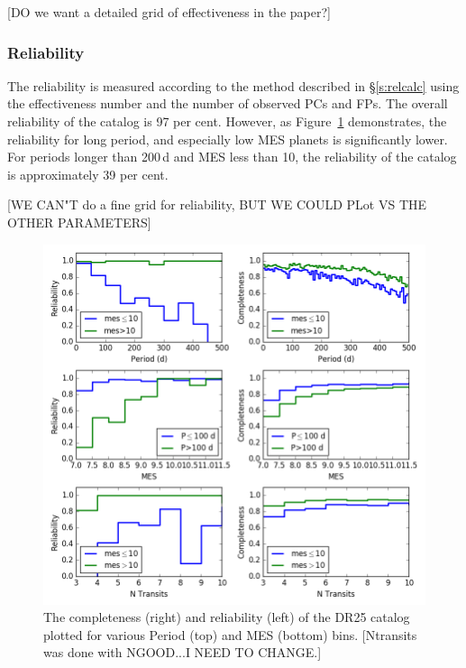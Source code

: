 [DO we want a detailed grid of effectiveness in the paper?]

\subsubsection{Reliability}
\label{s:reliability}
The reliability is measured according to the method described in \S\ref{s:relcalc} using the effectiveness number and the number of observed PCs and FPs.  The overall reliability of the catalog is 97 per cent. However, as Figure~\ref{f:1dcompare} demonstrates, the reliability for long period, and especially low MES planets is significantly lower.  For periods longer than 200\,d and MES less than 10, the reliability of the catalog is approximately 39 per cent.

[WE CAN"T do a fine grid for reliability, BUT WE COULD PLot VS THE  OTHER PARAMETERS]

\begin{figure}[h!]
 \begin{center}
  \includegraphics[width=1.0\linewidth]{fig-compRel1D-PerMes.png}
  \caption{ The completeness (right) and reliability (left) of the DR25 catalog plotted for various Period (top) and MES (bottom) bins. [Ntransits was done with NGOOD...I NEED TO CHANGE.] }
  \label{f:1dcompare}
 \end{center}
 \end{figure}





